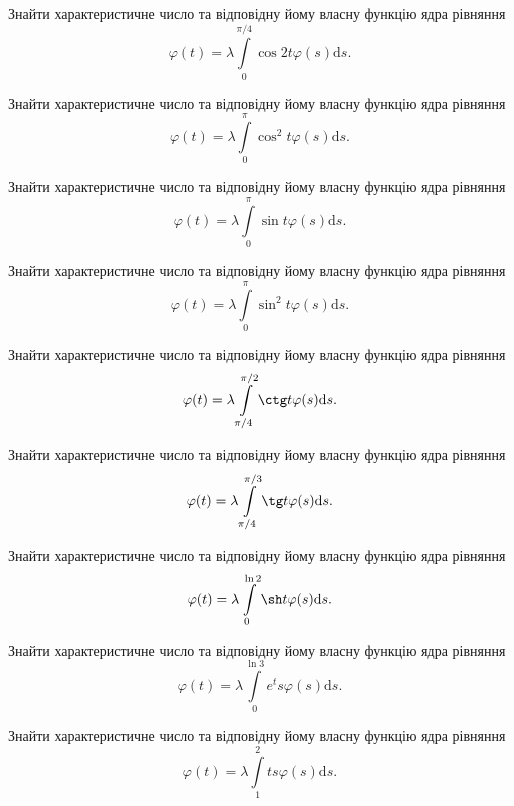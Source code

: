 \documentclass[12pt]{extarticle}
\begin{document}
\begin{Exercise}
Знайти характеристичне число та відповідну йому власну функцію ядра рівняння \[\varphi(t) = \lambda\int\limits_{0}^{\pi/4} \cos 2t \varphi(s) \mathrm{d}s.\]
\end{Exercise}

\begin{Exercise}
Знайти характеристичне число та відповідну йому власну функцію ядра рівняння \[\varphi(t) = \lambda\int\limits_{0}^{\pi} \cos^2 t \varphi(s) \mathrm{d}s.\]
\end{Exercise}

\begin{Exercise}
Знайти характеристичне число та відповідну йому власну функцію ядра рівняння \[\varphi(t) = \lambda\int\limits_{0}^{\pi} \sin t \varphi(s) \mathrm{d}s.\]
\end{Exercise}

\begin{Exercise}
Знайти характеристичне число та відповідну йому власну функцію ядра рівняння \[\varphi(t) = \lambda\int\limits_{0}^{\pi} \sin^2 t \varphi(s) \mathrm{d}s.\]
\end{Exercise}

\begin{Exercise}
Знайти характеристичне число та відповідну йому власну функцію ядра рівняння \[\varphi(t) = \lambda\int\limits_{\pi/4}^{\pi/2} \ctg t \varphi(s) \mathrm{d}s.\]
\end{Exercise}

\begin{Exercise}
Знайти характеристичне число та відповідну йому власну функцію ядра рівняння \[\varphi(t) = \lambda\int\limits_{\pi/4}^{\pi/3} \tg t \varphi(s) \mathrm{d}s.\]
\end{Exercise}

\begin{Exercise}
Знайти характеристичне число та відповідну йому власну функцію ядра рівняння \[\varphi(t) = \lambda\int\limits_{0}^{\ln 2} \sh t \varphi(s) \mathrm{d}s.\]
\end{Exercise}

\begin{Exercise}
Знайти характеристичне число та відповідну йому власну функцію ядра рівняння \[\varphi(t) = \lambda\int\limits_{0}^{\ln 3} e^t s \varphi(s) \mathrm{d}s.\]
\end{Exercise}

\begin{Exercise}
Знайти характеристичне число та відповідну йому власну функцію ядра рівняння \[\varphi(t) = \lambda\int\limits_{1}^{2} t s\varphi(s) \mathrm{d}s.\]
\end{Exercise}
\end{document}
